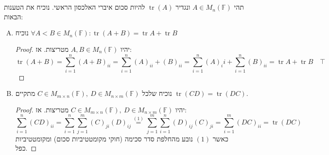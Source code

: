 \documentclass[]{article}
\DeclareMathOperator{\tr}     {tr}
\newcommand\F         {\mathbb{F}}
\newcommand\co        {\colon}
\theoremstyle{definition}
\begin{document}
    \section{}
    תהי $A \in M_n(\F)$ ונגדיר $\tr(A)$ להיות סכום איברי האלכסון הראשי. נוכיח את הטענות הבאות: 
    \begin{enumerate}[(A)]
        \item נוכיח $\forall A< B \in M_n(\F) \co \tr(A + B) = \tr A + \tr B$ \begin{proof}
            יהיו $A, B \in M_n(\F)$ מטריצות. אז: 
            \[ \tr(A + B) = \sum_{i = 1}^{n}(A + B)_{ii} = \sum_{i = 1}^{n}(A)_{ii} + (B)_{ii} = \sum_{i = 1}^{n}(A)_ii + \sum_{i = 1}^{n}(B)_{ii} = \tr A + \tr B \quad \top \]
        \end{proof}
        \item נוכיח שלכל $C \in M_{m \times n}(\F), \ D \in M_{n \times m}(\F)$ מתקיים $\tr(CD) = \tr(DC)$. \begin{proof}
            יהיו $C \in M_{m \times n}(\F),\ D \in M_{n \times m}(\F)$ מטריצות. אז: 
            \[ \sum_{i = 1}^{n}(CD)_{ii} = \sum_{i = 1}^{n}\sum_{j = 1}^{m}(C)_{ji}(D)_{ij} \overset{(1)}{=} \sum_{j = 1}^{m}\sum_{i = 1}^{n}(D)_{ij}(C)_{ji} = \sum_{i = 1}^{m}(DC)_{ii} = \tr(DC) \]
            כאשר $(1)$ נובע מהחלפת סדר סכימה (חוקי מקומטטיביות סכום) ומקומטטיביות כפל. 
        \end{proof}
    \end{enumerate}
    
\end{document}
